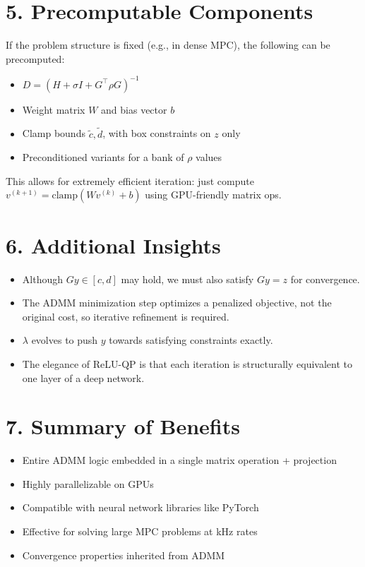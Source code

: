 \documentclass[11pt]{article}
\begin{document}
\section*{5. Precomputable Components}
If the problem structure is fixed (e.g., in dense MPC), the following can be precomputed:
\begin{itemize}
    \item $D = (H + \sigma I + G^\top \rho G)^{-1}$
    \item Weight matrix $W$ and bias vector $b$
    \item Clamp bounds $\tilde{c}, \tilde{d}$, with box constraints on $z$ only
    \item Preconditioned variants for a bank of $\rho$ values
\end{itemize}
This allows for extremely efficient iteration: just compute $v^{(k+1)} = \text{clamp}(W v^{(k)} + b)$ using GPU-friendly matrix ops.

\section*{6. Additional Insights}
\begin{itemize}
    \item Although $G y \in [c, d]$ may hold, we must also satisfy $G y = z$ for convergence.
    \item The ADMM minimization step optimizes a penalized objective, not the original cost, so iterative refinement is required.
    \item $\lambda$ evolves to push $y$ towards satisfying constraints exactly.
    \item The elegance of ReLU-QP is that each iteration is structurally equivalent to one layer of a deep network.
\end{itemize}

\section*{7. Summary of Benefits}
\begin{itemize}
    \item Entire ADMM logic embedded in a single matrix operation + projection
    \item Highly parallelizable on GPUs
    \item Compatible with neural network libraries like PyTorch
    \item Effective for solving large MPC problems at kHz rates
    \item Convergence properties inherited from ADMM
\end{itemize}
\end{document}
